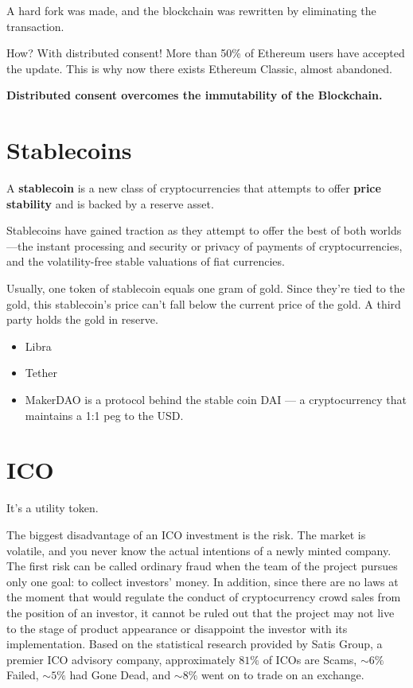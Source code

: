 A hard fork was made, and the blockchain was rewritten by eliminating the transaction.

How? With distributed consent! More than 50\% of Ethereum users have accepted the update. This is why now there exists Ethereum Classic, almost abandoned.

\textbf{Distributed consent overcomes the immutability of the Blockchain.}

\section{Stablecoins}




A \textbf{stablecoin} is a new class of cryptocurrencies that attempts to offer \textbf{price stability} and is backed by a reserve asset. 

Stablecoins have gained traction as they attempt to offer the best of both worlds—the instant processing and security or privacy of payments of cryptocurrencies, and the volatility-free stable valuations of fiat currencies.

Usually, one token of stablecoin equals one gram of gold. Since they’re tied to the gold, this stablecoin’s price can’t fall below the current price of the gold. A third party holds the gold in reserve.

\begin{itemize}
	\item Libra
	\item Tether
	\item MakerDAO is a protocol behind the stable coin DAI — a cryptocurrency that maintains a 1:1 peg to the USD. 
\end{itemize}

\section{ICO}

It's a utility token.

The biggest disadvantage of an ICO investment is the risk. The market is volatile, and you never know the actual intentions of a newly minted company. The first risk can be called ordinary fraud when the team of the project pursues only one goal: to collect investors' money. In addition, since there are no laws at the moment that would regulate the conduct of cryptocurrency crowd sales from the position of an investor, it cannot be ruled out that the project may not live to the stage of product appearance or disappoint the investor with its implementation. Based on the statistical research provided by Satis Group, a premier ICO advisory company, approximately $81\%$ of ICOs are Scams, $\sim 6\%$ Failed, $\sim 5\%$ had Gone Dead, and $\sim 8\%$ went on to trade on an exchange.

